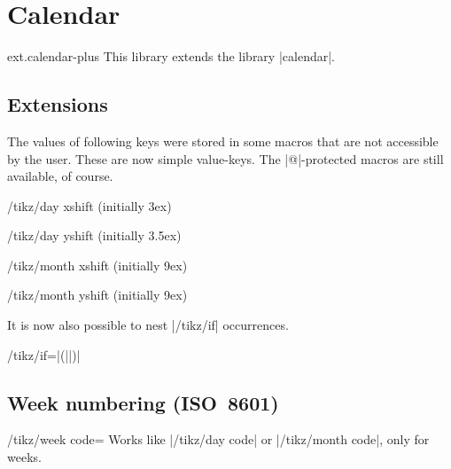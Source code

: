 %
%
%

\section{Calendar}
\begin{tikzlibrary}{ext.calendar-plus}
  This library extends the \tikzname\space library |calendar|.
\end{tikzlibrary}

\begin{multicols}{2}

\subsection{Extensions}

The values of following keys were stored in some macros that are not
accessible by the user. These are now simple value-keys.
The |@|-protected macros are still available, of course.

\begin{key}{/tikz/day xshift (initially 3ex)}
\end{key}
\begin{key}{/tikz/day yshift (initially 3.5ex)}
\end{key}
\begin{key}{/tikz/month xshift (initially 9ex)}
\end{key}
\begin{key}{/tikz/month yshift (initially 9ex)}
\end{key}

It is now also possible to nest |/tikz/if| occurrences.
\begin{key}{/tikz/if=|(||)|}
\end{key}

\subsection{Week numbering (ISO~8601)}

\begin{key}{/tikz/week code=}
  Works like |/tikz/day code| or |/tikz/month code|, only for weeks.
\end{key}


\end{multicols}
